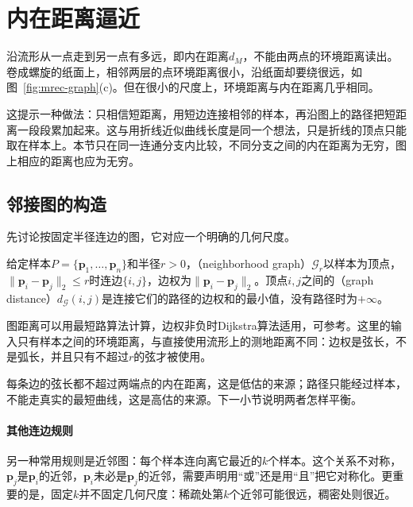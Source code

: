 \section{内在距离逼近}
\label{sec:mrec-intrinsic-distance}

沿流形从一点走到另一点有多远，即内在距离$d_M$，不能由两点的环境距离读出。卷成螺旋的纸面上，相邻两层的点环境距离很小，沿纸面却要绕很远，如图~\ref{fig:mrec-graph}(c)。但在很小的尺度上，环境距离与内在距离几乎相同。

这提示一种做法：只相信短距离，用短边连接相邻的样本，再沿图上的路径把短距离一段段累加起来。这与用折线近似曲线长度是同一个想法，只是折线的顶点只能取在样本上。本节只在同一连通分支内比较，不同分支之间的内在距离为无穷，图上相应的距离也应为无穷。

\subsection{邻接图的构造}
\label{sec:mrec-neighborhood-graph}

先讨论按固定半径连边的图，它对应一个明确的几何尺度。

\begin{definition}[半径邻域图与图距离]
\label{def:mrec-neighborhood-graph}
给定样本$P=\{\bm p_1,\ldots,\bm p_n\}$和半径$r>0$，（neighborhood graph）$\mathcal G_r$以样本为顶点，$\lVert\bm p_i-\bm p_j\rVert_2\leq r$时连边$\{i,j\}$，边权为$\lVert\bm p_i-\bm p_j\rVert_2$。顶点$i,j$之间的（graph distance）$d_{\mathcal G}(i,j)$是连接它们的路径的边权和的最小值，没有路径时为$+\infty$。
\end{definition}

图距离可以用最短路算法计算，边权非负时Dijkstra算法适用，可参考。这里的输入只有样本之间的环境距离，与直接使用流形上的测地距离不同：边权是弦长，不是弧长，并且只有不超过$r$的弦才被使用。

每条边的弦长都不超过两端点的内在距离，这是低估的来源；路径只能经过样本，不能走真实的最短曲线，这是高估的来源。下一小节说明两者怎样平衡。

\paragraph{其他连边规则}

另一种常用规则是近邻图：每个样本连向离它最近的$k$个样本。这个关系不对称，$\bm p_j$是$\bm p_i$的近邻，$\bm p_i$未必是$\bm p_j$的近邻，需要声明用“或”还是用“且”把它对称化。更重要的是，固定$k$并不固定几何尺度：稀疏处第$k$个近邻可能很远，稠密处则很近。

